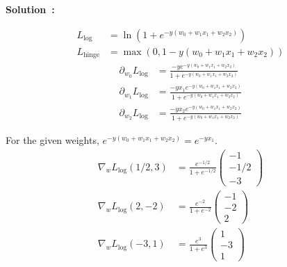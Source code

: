 \documentclass{article}
\newcounter{problem}[section]
\newenvironment{solution}[1][]
    {\par\medskip \begin{mdframed}\textbf{Solution~\Alph{problem}#1:} \begin{em}}
    {\end{em}\medskip\end{mdframed}\medskip}
\begin{document}
\begin{solution}
  \begin{align*}
    L_\text{log} &= \ln( 1 + e^{-y(w_0 + w_1 x_1 + w_2 x_2)} ) \\
    L_\text{hinge} &= \max( 0, 1 - y(w_0 + w_1 x_1 + w_2 x_2) )
  \end{align*}
  \begin{align*}
    \partial_{w_0} L_\text{log} &= \frac{ -y e^{-y(w_0 + w_1 x_1 + w_2 x_2)} }{ 1 + e^{-y(w_0 + w_1 x_1 + w_2 x_2)} } \\
    \partial_{w_1} L_\text{log} &= \frac{ -y x_1 e^{-y(w_0 + w_1 x_1 + w_2 x_2)} }{ 1 + e^{-y(w_0 + w_1 x_1 + w_2 x_2)} } \\
    \partial_{w_2} L_\text{log} &= \frac{ -y x_2 e^{-y(w_0 + w_1 x_1 + w_2 x_2)} }{ 1 + e^{-y(w_0 + w_1 x_1 + w_2 x_2)} }
  \end{align*}

  For the given weights, $e^{-y(w_0 + w_1 x_1 + w_2 x_2)} = e^{-y x_1}$.
  \begin{align*}
    \nabla_w L_\text{log} (1/2, 3) &= \frac{e^{-1/2}}{1 + e^{-1/2}} \begin{pmatrix} -1 \\ -1/2 \\ -3 \end{pmatrix} \\
    \nabla_w L_\text{log} (2, -2)  &= \frac{e^{-2}}{1 + e^{-2}} \begin{pmatrix} -1 \\ -2 \\ 2 \end{pmatrix} \\
    \nabla_w L_\text{log} (-3, 1)  &= \frac{e^{3}}{1 + e^{3}} \begin{pmatrix} 1 \\ -3 \\ 1 \end{pmatrix}
  \end{align*}


\end{solution}
\end{document}
